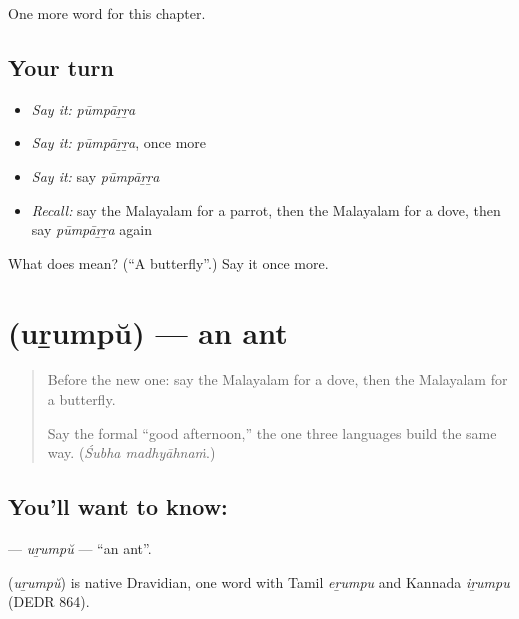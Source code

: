 \begin{grammarlens}[title={What you've built}]
One more word for this chapter.
\end{grammarlens}

\subsection*{Your turn}
\begin{itemize}
\raggedright
  \item \emph{Say it:} \emph{pūmpāṟṟa}
  \item \emph{Say it:} \emph{pūmpāṟṟa}, once more
  \item \emph{Say it:} say \emph{pūmpāṟṟa}
  \item \emph{Recall:} say the Malayalam for a parrot, then the Malayalam for a dove, then say \emph{pūmpāṟṟa} again
\end{itemize}

\begin{tcolorbox}[breakable,colback=teal!4,colframe=teal!35!black,title={Before you move on}]
What does  mean? (\textquotedblleft{}A butterfly\textquotedblright{}.) Say it once more.
\end{tcolorbox}
\section[\texorpdfstring{\ml{ഉറുമ്പ്} (uṟumpŭ)}{ഉറുമ്പ് (uṟumpŭ)}]{ (uṟumpŭ) — an ant}

\label{lesson:ML-C153-urumpu}



\begin{quote}
Before the new one: say the Malayalam for a dove, then the Malayalam for a butterfly.

Say the formal \textquotedblleft{}good afternoon,\textquotedblright{} the one three languages build the same way. (\emph{Śubha madhyāhnaṁ}.)
\end{quote}

\subsection*{You'll want to know: }
\textbf{} — \emph{uṟumpŭ} — \textquotedblleft{}an ant\textquotedblright{}.

\begin{cousinweb}
\textbf{} (\emph{uṟumpŭ}) is native Dravidian, one word with Tamil \emph{eṟumpu} and Kannada \emph{iṟumpu} (DEDR 864).
\end{cousinweb}

